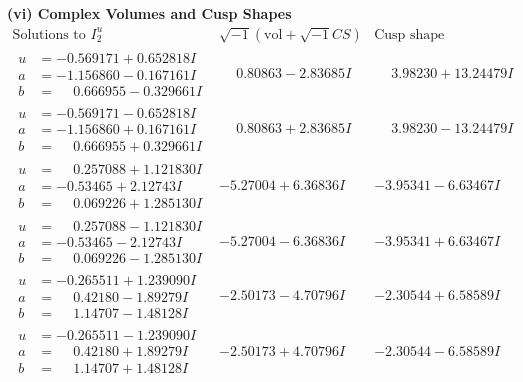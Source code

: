 \documentclass[1p]{elsarticle_modified}
\theoremstyle{definition}
\newcommand{\I}{\sqrt{-1}}
\begin{document}
\newpage\flushleft \textbf{(vi) Complex Volumes and Cusp Shapes}
$$\begin{array}{c|c|c}  
\text{Solutions to }I^u_{2}& \I (\text{vol} + \sqrt{-1}CS) & \text{Cusp shape}\\
 \hline 
\begin{aligned}
u &= -0.569171 + 0.652818 I \\
a &= -1.156860 - 0.167161 I \\
b &= \phantom{-}0.666955 - 0.329661 I\end{aligned}
 & \phantom{-}0.80863 - 2.83685 I & \phantom{-}3.98230 + 13.24479 I \\ \hline\begin{aligned}
u &= -0.569171 - 0.652818 I \\
a &= -1.156860 + 0.167161 I \\
b &= \phantom{-}0.666955 + 0.329661 I\end{aligned}
 & \phantom{-}0.80863 + 2.83685 I & \phantom{-}3.98230 - 13.24479 I \\ \hline\begin{aligned}
u &= \phantom{-}0.257088 + 1.121830 I \\
a &= -0.53465 + 2.12743 I \\
b &= \phantom{-}0.069226 + 1.285130 I\end{aligned}
 & -5.27004 + 6.36836 I & -3.95341 - 6.63467 I \\ \hline\begin{aligned}
u &= \phantom{-}0.257088 - 1.121830 I \\
a &= -0.53465 - 2.12743 I \\
b &= \phantom{-}0.069226 - 1.285130 I\end{aligned}
 & -5.27004 - 6.36836 I & -3.95341 + 6.63467 I \\ \hline\begin{aligned}
u &= -0.265511 + 1.239090 I \\
a &= \phantom{-}0.42180 - 1.89279 I \\
b &= \phantom{-}1.14707 - 1.48128 I\end{aligned}
 & -2.50173 - 4.70796 I & -2.30544 + 6.58589 I \\ \hline\begin{aligned}
u &= -0.265511 - 1.239090 I \\
a &= \phantom{-}0.42180 + 1.89279 I \\
b &= \phantom{-}1.14707 + 1.48128 I\end{aligned}
 & -2.50173 + 4.70796 I & -2.30544 - 6.58589 I \\ \hline\begin{aligned}

\end{aligned}
\end{array}$$
\end{document}
